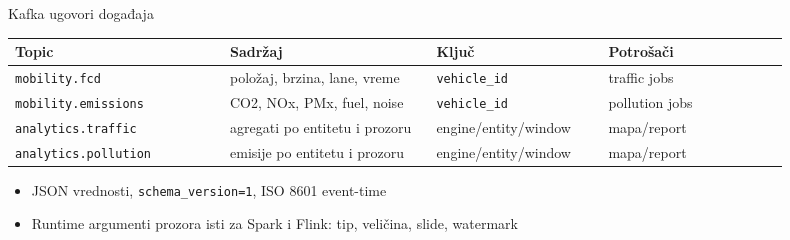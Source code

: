 \documentclass[aspectratio=169,11pt]{beamer}
\newcommand{\code}[1]{\texttt{\small #1}}
\newcommand{\tinycode}[1]{\texttt{\scriptsize #1}}
\begin{document}
\begin{frame}{Kafka ugovori događaja}
  \small
  \begin{tabular}{@{}>{\raggedright\arraybackslash}p{0.25\linewidth}>{\raggedright\arraybackslash}p{0.24\linewidth}>{\raggedright\arraybackslash}p{0.20\linewidth}>{\raggedright\arraybackslash}p{0.21\linewidth}@{}}
    \toprule
    Topic & Sadržaj & Ključ & Potrošači \\
    \midrule
    \tinycode{mobility.fcd} & položaj, brzina, lane, vreme & \tinycode{vehicle\_id} & traffic jobs \\
    \tinycode{mobility.emissions} & CO2, NOx, PMx, fuel, noise & \tinycode{vehicle\_id} & pollution jobs \\
    \tinycode{analytics.traffic} & agregati po entitetu i prozoru & engine/entity/window & mapa/report \\
    \tinycode{analytics.pollution} & emisije po entitetu i prozoru & engine/entity/window & mapa/report \\
    \bottomrule
  \end{tabular}

  \vspace{0.55em}
  \begin{itemize}
    \item JSON vrednosti, \code{schema\_version=1}, ISO 8601 event-time
    \item Runtime argumenti prozora isti za Spark i Flink: tip, veličina, slide, watermark
  \end{itemize}
\end{frame}
\end{document}
